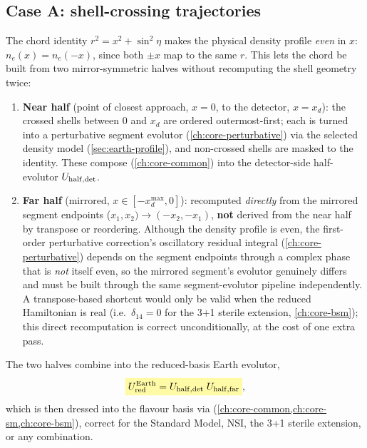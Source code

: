 \begin{theorybox}
\subsection*{Case A: shell-crossing trajectories}
The chord identity $r^2=x^2+\sin^2\eta$ makes the physical density profile
\emph{even} in $x$: $n_e(x)=n_e(-x)$, since both $\pm x$ map to the same
$r$. This lets the chord be built from two mirror-symmetric halves without
recomputing the shell geometry twice:
\begin{enumerate}
  \item \textbf{Near half} (point of closest approach, $x=0$, to the
    detector, $x=x_d$): the crossed shells between $0$ and $x_d$ are
    ordered outermost-first; each is turned into a perturbative segment
    evolutor (\cref{ch:core-perturbative}) via the selected density model
    (\cref{sec:earth-profile}), and non-crossed shells are masked to the
    identity. These compose (\cref{ch:core-common}) into the detector-side
    half-evolutor $U_{\rm half,det}$.
  \item \textbf{Far half} (mirrored, $x\in[-x_d^{\max},0]$): recomputed
    \emph{directly} from the mirrored segment endpoints
    ($x_1,x_2)\to(-x_2,-x_1)$, \textbf{not} derived from the near half by
    transpose or reordering. Although the density profile is even, the
    first-order perturbative correction's oscillatory residual integral
    (\cref{ch:core-perturbative}) depends on the segment endpoints through a
    complex phase that is \emph{not} itself even, so the mirrored segment's
    evolutor genuinely differs and must be built through the same
    segment-evolutor pipeline independently. A transpose-based shortcut
    would only be valid when the reduced Hamiltonian is real (i.e.\
    $\delta_{14}=0$ for the 3+1 sterile extension, \cref{ch:core-bsm}); this
    direct recomputation is correct unconditionally, at the cost of one
    extra pass.
\end{enumerate}
The two halves combine into the reduced-basis Earth evolutor,
\begin{equation}
  \keyresult{U_{\rm red}^{\rm Earth} = U_{\rm half,det}\;U_{\rm half,far}},
\end{equation}
which is then dressed into the flavour basis via
 (\cref{ch:core-common,ch:core-sm,ch:core-bsm}),
correct for the Standard Model, NSI, the 3+1 sterile extension, or any
combination.


\end{theorybox}

